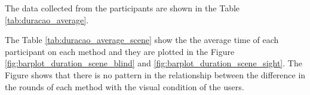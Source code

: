 
The data collected from the participants are shown in the Table \ref{tab:duracao_average}.



The Table \ref{tab:duracao_average_scene} show the the average time of each participant on each method and they are plotted in the Figure \ref{fig:barplot_duration_scene_blind} and \ref{fig:barplot_duration_scene_sight}. The Figure shows that there is no pattern in the relationship between the difference in the rounds of each method with the visual condition of the users. 





